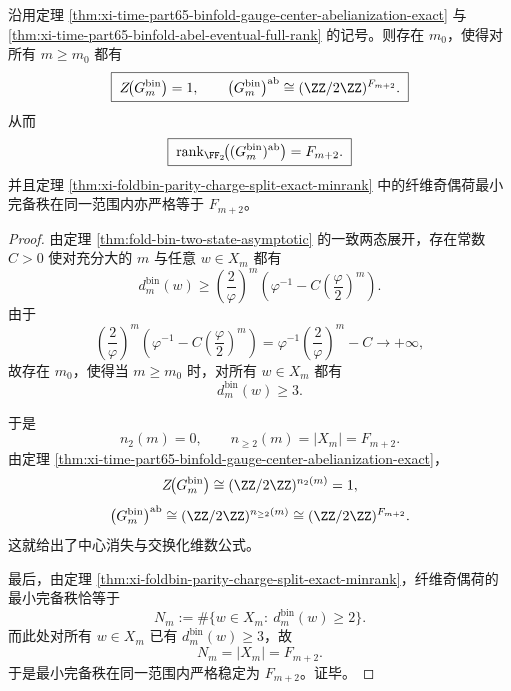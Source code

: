 \begin{theorem}\label{thm:xi-time-part65-binfold-center-vanishing-signature-stability}
沿用定理 \ref{thm:xi-time-part65-binfold-gauge-center-abelianization-exact} 与
\ref{thm:xi-time-part65-binfold-abel-eventual-full-rank} 的记号。则存在 \(m_0\)，使得对所有 \(m\ge m_0\) 都有
\[
\boxed{\;
Z\!\bigl(G_m^{\mathrm{bin}}\bigr)=1,
\qquad
\bigl(G_m^{\mathrm{bin}}\bigr)^{\mathrm{ab}}
\cong
(\ZZ/2\ZZ)^{F_{m+2}}.\;}
\]
从而
\[
\boxed{\;
\operatorname{rank}_{\FF_2}\!\bigl((G_m^{\mathrm{bin}})^{\mathrm{ab}}\bigr)=F_{m+2}.\;}
\]
并且定理 \ref{thm:xi-foldbin-parity-charge-split-exact-minrank} 中的纤维奇偶荷最小完备秩在同一范围内亦严格等于 \(F_{m+2}\)。
\end{theorem}
\begin{proof}
由定理 \ref{thm:fold-bin-two-state-asymptotic} 的一致两态展开，存在常数 \(C>0\) 使对充分大的 \(m\) 与任意 \(w\in X_m\) 都有
\[
d_m^{\mathrm{bin}}(w)
\ge
\left(\frac{2}{\varphi}\right)^m
\left(\varphi^{-1}-C\left(\frac{\varphi}{2}\right)^m\right).
\]
由于
\[
\left(\frac{2}{\varphi}\right)^m
\left(\varphi^{-1}-C\left(\frac{\varphi}{2}\right)^m\right)
=
\varphi^{-1}\left(\frac{2}{\varphi}\right)^m-C
\longrightarrow +\infty,
\]
故存在 \(m_0\)，使得当 \(m\ge m_0\) 时，对所有 \(w\in X_m\) 都有
\[
d_m^{\mathrm{bin}}(w)\ge 3.
\]

于是
\[
n_2(m)=0,
\qquad
n_{\ge 2}(m)=|X_m|=F_{m+2}.
\]
由定理 \ref{thm:xi-time-part65-binfold-gauge-center-abelianization-exact}，
\[
Z\!\bigl(G_m^{\mathrm{bin}}\bigr)\cong (\ZZ/2\ZZ)^{n_2(m)}=1,
\]
\[
\bigl(G_m^{\mathrm{bin}}\bigr)^{\mathrm{ab}}
\cong
(\ZZ/2\ZZ)^{n_{\ge 2}(m)}
\cong
(\ZZ/2\ZZ)^{F_{m+2}}.
\]
这就给出了中心消失与交换化维数公式。

最后，由定理 \ref{thm:xi-foldbin-parity-charge-split-exact-minrank}，纤维奇偶荷的最小完备秩恰等于
\[
N_m:=\#\{w\in X_m:\ d_m^{\mathrm{bin}}(w)\ge 2\}.
\]
而此处对所有 \(w\in X_m\) 已有 \(d_m^{\mathrm{bin}}(w)\ge 3\)，故
\[
N_m=|X_m|=F_{m+2}.
\]
于是最小完备秩在同一范围内严格稳定为 \(F_{m+2}\)。证毕。
\end{proof}


